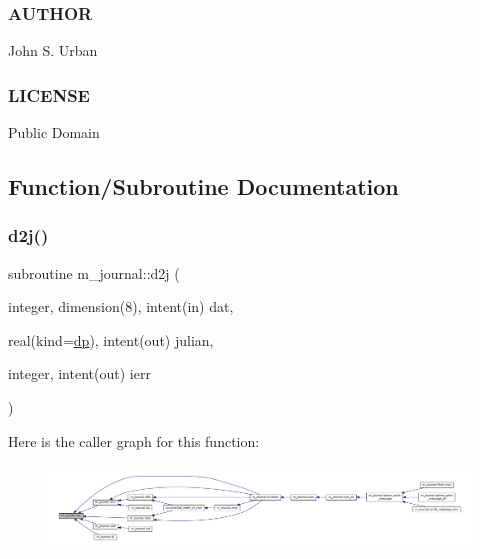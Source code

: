\subsubsection*{A\+U\+T\+H\+OR}

John S. Urban \subsubsection*{L\+I\+C\+E\+N\+SE}

Public Domain 

\subsection{Function/\+Subroutine Documentation}
\mbox{\label{namespacem__journal_a3978099ba1a861a6a67260c3060fc672}} 
\subsubsection{\texorpdfstring{d2j()}{d2j()}}
{\footnotesize\ttfamily subroutine m\+\_\+journal\+::d2j (\begin{DoxyParamCaption}\item[{integer, dimension(8), intent(in)}]{dat,  }\item[{real(kind=\mbox{\hyperlink{namespacem__journal_aaae0522a70bb76a85ea800670d5fec5f}{dp}}), intent(out)}]{julian,  }\item[{integer, intent(out)}]{ierr }\end{DoxyParamCaption})\hspace{0.3cm}{\ttfamily [private]}}

Here is the caller graph for this function\+:\nopagebreak
\begin{figure}[H]
\begin{center}
\leavevmode
\includegraphics[width=350pt]{namespacem__journal_a3978099ba1a861a6a67260c3060fc672_icgraph}
\end{center}
\end{figure}
\mbox{\label{namespacem__journal_ac12ae324e8c89f7400fb9ef0a581dc00}} 
